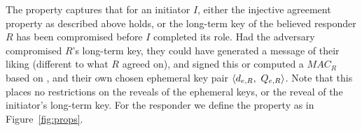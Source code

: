%
The property captures that for an initiator $I$, either the injective agreement
property as described above holds, or the long-term key of the believed
responder $R$ has been compromised before $I$ completed its role.
%
Had the adversary compromised $R$'s long-term key, they could have generated a
message of their liking (different to what $R$ agreed on), and signed this or
computed a $\mathit{MAC}_R$ based on ,  and their own chosen
ephemeral key pair $\langle d_{e,R},\ Q_{e,R}\rangle$.
%
Note that this places no restrictions on the reveals of the ephemeral
keys, or the reveal of the initiator's long-term key.
%
For the responder we define the property \mPredInjR{} as in
Figure~\ref{fig:props}.
%
